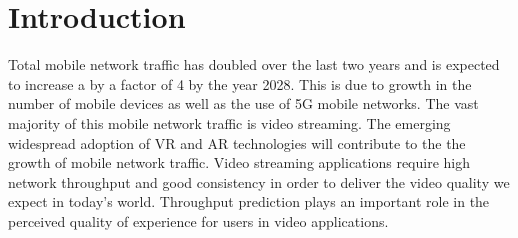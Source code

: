 \chapter{Introduction}
	Total mobile network traffic has doubled over the last two years and is expected to increase a by a factor of 4 by the year 2028. This is due to growth in the number of mobile devices as well as the use of 5G mobile networks. The vast majority of this mobile network traffic is video streaming. \cite{ericsson_mobility_report} The emerging widespread adoption of VR and AR technologies will contribute to the the growth of mobile network traffic. Video streaming applications require high network throughput and good consistency in order to deliver the video quality we expect in today's world. Throughput prediction plays an important role in the perceived quality of experience for users in video applications.